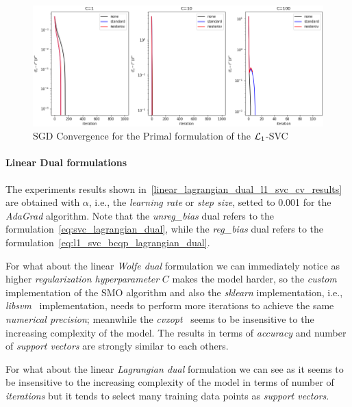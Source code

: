 \begin{figure}[H]
	\centering
	\includegraphics[scale=0.55]{img/l1_svc_loss_history}
	\caption{SGD Convergence for the Primal formulation of the $\protect \mathcal{L}_1$-SVC}
	\label{fig:l1_svc_history}
\end{figure}

\paragraph{Linear Dual formulations}

The experiments results shown in~\ref{linear_lagrangian_dual_l1_svc_cv_results} are obtained with $\alpha$, i.e., the \emph{learning rate} or \emph{step size}, setted to 0.001 for the \emph{AdaGrad} algorithm. Note that the \emph{unreg\_bias} dual refers to the formulation~\eqref{eq:svc_lagrangian_dual}, while the \emph{reg\_bias} dual refers to the formulation~\eqref{eq:l1_svc_bcqp_lagrangian_dual}.



For what about the linear \emph{Wolfe dual} formulation we can immediately notice as higher \emph{regularization hyperparameter} $C$ makes the model harder, so the \emph{custom} implementation of the SMO algorithm and also the \emph{sklearn} implementation, i.e., \emph{libsvm}~\cite{chang2011libsvm} implementation, needs to perform more iterations to achieve the same \emph{numerical precision}; meanwhile the \emph{cvxopt}~\cite{vandenberghe2010cvxopt} seems to be insensitive to the increasing complexity of the model. The results in terms of \emph{accuracy} and number of \emph{support vectors} are strongly similar to each others.



For what about the linear \emph{Lagrangian dual} formulation we can see as it seems to be insensitive to the increasing complexity of the model in terms of number of \emph{iterations} but it tends to select many training data points as \emph{support vectors}.

